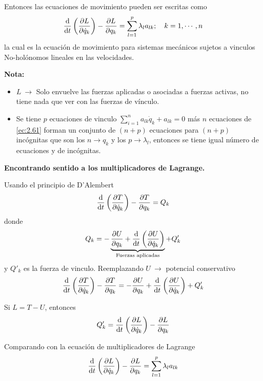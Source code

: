 \documentclass[../main]{subfiles}
\begin{document}
Entonces las ecuaciones de movimiento pueden ser escritas como
\begin{equation}
    \dv{}{t}\left(\pdv{L}{\dot{q}_k}\right)-\pdv{L}{q_k}=\sum_{l=1}^p \lambda_l a_{lk}; \quad k=1, \cdots, n
    \label{ec:2.61}
\end{equation}
la cual es la ecuación de movimiento para sistemas mecánicos sujetos a vinculos No-holónomos lineales en las velocidades.

\textbf{Nota:}
\begin{itemize}
    \item $L \ \rightarrow$ Solo envuelve las fuerzas aplicadas o asociadas a fuerzas activas, no tiene nada que ver con las fuerzas de vínculo.
    \item Se tiene $p$ ecuaciones de vinculo $\displaystyle \sum_{i=1}^n a_{lk}\dot{q}_k+a_{lk}=0$ más $n$ ecuaciones de \eqref{ec:2.61} forman un conjunto de $(n+p)$ ecuaciones para $(n+p)$ incógnitas que son los $n\rightarrow q_k$ y los $p\rightarrow \lambda_l$, entonces se tiene igual número de ecuaciones y de incógnitas.
\end{itemize}

\textbf{Encontrando sentido a los multiplicadores de Lagrange.}

Usando el principio de D'Alembert
\begin{equation}
    \dv{}{t}\left(\pdv{T}{\dot{q}_k}\right)-\pdv{T}{q_k}=Q_k
\end{equation}
donde
\begin{equation}
    Q_k=-\underbrace{\pdv{U}{q_k}+\dv{}{t}\left(\pdv{U}{\dot{q}_k}\right)}_{\text{Fuerzas aplicadas}}+Q'_k
\end{equation}
y $Q'_k$ es la fuerza de vinculo. Reemplazando $U \ \rightarrow$ potencial conservativo
\begin{equation}
    \dv{}{t}\left(\pdv{T}{\dot{q}_k}\right)-\pdv{T}{q_k}=-\pdv{U}{q_k}+\dv{}{t}\left(\pdv{U}{\dot{q}_k}\right)+Q'_k
\end{equation}

Si $L=T-U$, entonces
\begin{equation}
    Q'_k=\dv{}{t}\left(\pdv{L}{\dot{q}_k}\right)-\pdv{L}{q_k}
\end{equation}

Comparando con la ecuación de multiplicadores de Lagrange
\begin{equation}
    \dv{}{t}\left(\pdv{L}{\dot{q}_k}\right)-\pdv{L}{q_k}=\sum_{l=1}^p \lambda_l a_{lk}
\end{equation}
\end{document}
